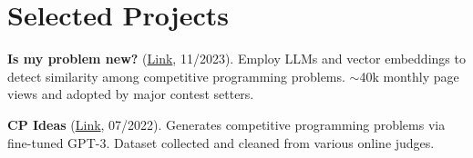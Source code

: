 \documentclass[11pt,letterpaper]{article}
\begin{document}
\section*{Selected Projects}
\begin{outerlist}
\item \textbf{Is my problem new?} (\href{http://yuantiji.ac/}{Link}, 11/2023). Employ LLMs and vector embeddings to detect similarity among competitive programming problems. $\sim$40k monthly page views and adopted by major contest setters.
\item \textbf{CP Ideas} (\href{https://fjzzq2002.github.io/cpideas/}{Link}, 07/2022). Generates competitive programming problems via fine-tuned GPT-3. Dataset collected and cleaned from various online judges.
\end{outerlist}
\end{document}
